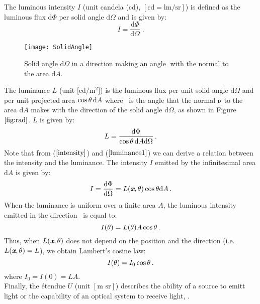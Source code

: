 The luminous intensity $I$ (unit candela (\textrm{cd}), $[\textrm{cd}=\textrm{lm}/\textrm{sr}]$) is defined as the luminous flux $\textrm{d}\Phi$ per solid angle
$\textrm{d}\Omega$ and is given by:
\begin{equation}\label{intensity}
I = \frac{\textrm{d}\Phi}{\textrm{d}\Omega}\;.
\end{equation}
 \begin{figure}[h]
  \begin{center}
  \texttt{[image: SolidAngle]}
  \end{center}
  \caption{Solid angle $\textrm{d}\Omega$ in a direction making an angle \myangle $\;$with the normal to the area $\textrm{d}A$.}
  \label{fig:rad}
  \end{figure}The luminance $L$ \big(unit $\big[\textrm{cd} / \textrm{m}^2\big]$\big) is the luminous flux per unit solid angle $\textrm{d}\Omega$ and  per unit projected area $\cos\mbox{$\theta$}\,\textrm{d}A$ where \myangle $\,$ is the angle that the normal $\boldsymbol{\nu}$ to the area $\textrm{d}A$ makes with the direction of the solid angle $\textrm{d}\Omega$, as shown in Figure $\ref{fig:rad}$.  $L$  is given by:
\begin{equation}\label{luminance1}
  L=\frac{\textrm{d}\Phi}{\cos\mbox{$\theta$}\,\textrm{d}A\textrm{d}\Omega}\,.
\end{equation}
\noindent Note that from ($\ref{intensity}$) and ($\ref{luminance1}$) we can derive a relation between the intensity and the luminance. 
The intensity $I$ emitted by the infinitesimal area $\textrm{d}A$ is given by:
\begin{equation}
I = \frac{\textrm{d}\Phi}{\textrm{d}\Omega}= L(\textit{\textbf{x}},\mbox{$\theta$})\cos\mbox{$\theta$}\textrm{d}A \,.
\end{equation}
When the luminance is uniform over a finite area $A$, the luminous intensity emitted in the direction \myangle $\,$ is equal to:
\begin{equation}
I(\mbox{$\theta$}) = L(\mbox{$\theta$}) A \cos\mbox{$\theta$}\,.
\end{equation}
Thus, when $L(\textit{\textbf{x}},\mbox{$\theta$})$ does not depend on the position and the direction (i.e. $L(\textit{\textbf{x}},\mbox{$\theta$})=L$), we obtain Lambert's cosine law:
\begin{equation}
I(\mbox{$\theta$}) = I_0\cos\mbox{$\theta$}\,.
\end{equation}
where $I_0 = I(0) = LA$. \\
\indent Finally, the \'{e}tendue $U$ (unit $[\textrm{m sr}]$) describes the ability of a source to emitt light or the capability of an optical system to receive light, \cite{zhu2011etendue}.
